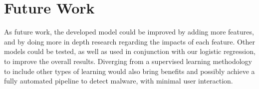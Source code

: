 \section{Future Work}
\label{section:future}

As future work, the developed model could be improved by adding more features, and by doing more in depth research regarding the impacts of each feature.
Other models could be tested, as well as used in conjunction with our logistic regression, to improve the overall results.
Diverging from a supervised learning methodology to include other types of learning would also bring benefits and possibly achieve a fully automated pipeline to detect malware, with minimal user interaction.
